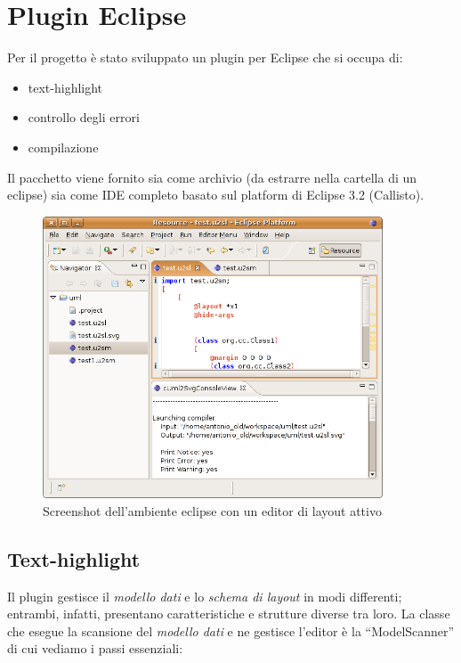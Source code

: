 \section{Plugin Eclipse}

Per il progetto è stato sviluppato un plugin per Eclipse che si occupa di:
\begin{itemize}
  \item text-highlight
  \item controllo degli errori
  \item compilazione
\end{itemize} 

Il pacchetto viene fornito sia come archivio (da estrarre nella cartella di un
eclipse) sia come IDE completo basato sul platform di Eclipse 3.2 (Callisto).

\begin{figure}[htp]
\begin{center}
  \includegraphics[width=0.9\textwidth]{img/eclipse}
  \caption[labelInTOC]{Screenshot dell'ambiente eclipse con un editor di layout
  attivo}
  \label{errorieditor} 
\end{center}
\end{figure}


\subsection{Text-highlight}
Il plugin gestisce il \emph{modello dati} e lo \emph{schema di layout} in modi differenti; 
entrambi, infatti, presentano caratteristiche e strutture diverse tra loro. 
La classe che esegue la scansione del \emph{modello dati} e ne gestisce l'editor
è la ``ModelScanner'' di cui vediamo i passi essenziali:


